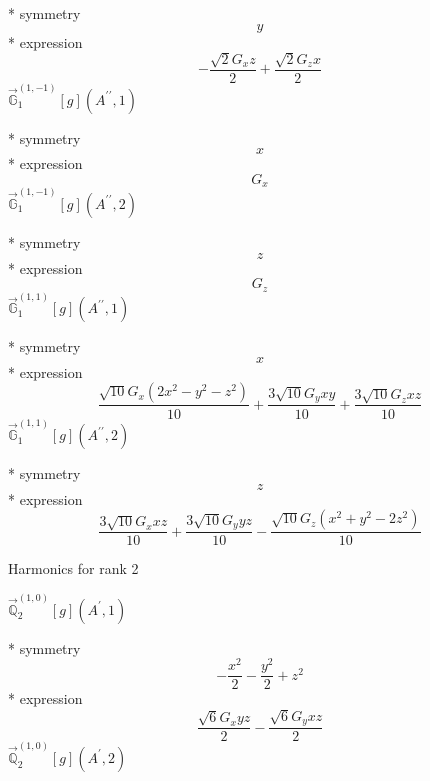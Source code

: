 \documentclass[fleqn,8pt]{jsarticle}
\begin{document}
\noindent\quad ** symmetry
\begin{dmath*}
y
\end{dmath*}
\noindent\quad ** expression
\begin{dmath*}
- \frac{\sqrt{2} G_{x} z}{2} + \frac{\sqrt{2} G_{z} x}{2}
\end{dmath*}
\noindent\quad $\vec{\mathbb{G}}_{1}^{(1,-1)}[g](A^{\prime\prime},1)$

\noindent\quad ** symmetry
\begin{dmath*}
x
\end{dmath*}
\noindent\quad ** expression
\begin{dmath*}
G_{x}
\end{dmath*}
\noindent\quad $\vec{\mathbb{G}}_{1}^{(1,-1)}[g](A^{\prime\prime},2)$

\noindent\quad ** symmetry
\begin{dmath*}
z
\end{dmath*}
\noindent\quad ** expression
\begin{dmath*}
G_{z}
\end{dmath*}
\noindent\quad $\vec{\mathbb{G}}_{1}^{(1,1)}[g](A^{\prime\prime},1)$

\noindent\quad ** symmetry
\begin{dmath*}
x
\end{dmath*}
\noindent\quad ** expression
\begin{dmath*}
\frac{\sqrt{10} G_{x} \left(2 x^{2} - y^{2} - z^{2}\right)}{10} + \frac{3 \sqrt{10} G_{y} x y}{10} + \frac{3 \sqrt{10} G_{z} x z}{10}
\end{dmath*}
\noindent\quad $\vec{\mathbb{G}}_{1}^{(1,1)}[g](A^{\prime\prime},2)$

\noindent\quad ** symmetry
\begin{dmath*}
z
\end{dmath*}
\noindent\quad ** expression
\begin{dmath*}
\frac{3 \sqrt{10} G_{x} x z}{10} + \frac{3 \sqrt{10} G_{y} y z}{10} - \frac{\sqrt{10} G_{z} \left(x^{2} + y^{2} - 2 z^{2}\right)}{10}
\end{dmath*}

\noindent * Harmonics for rank 2

\noindent\quad $\vec{\mathbb{Q}}_{2}^{(1,0)}[g](A^{\prime},1)$

\noindent\quad ** symmetry
\begin{dmath*}
- \frac{x^{2}}{2} - \frac{y^{2}}{2} + z^{2}
\end{dmath*}
\noindent\quad ** expression
\begin{dmath*}
\frac{\sqrt{6} G_{x} y z}{2} - \frac{\sqrt{6} G_{y} x z}{2}
\end{dmath*}
\noindent\quad $\vec{\mathbb{Q}}_{2}^{(1,0)}[g](A^{\prime},2)$
\end{document}
